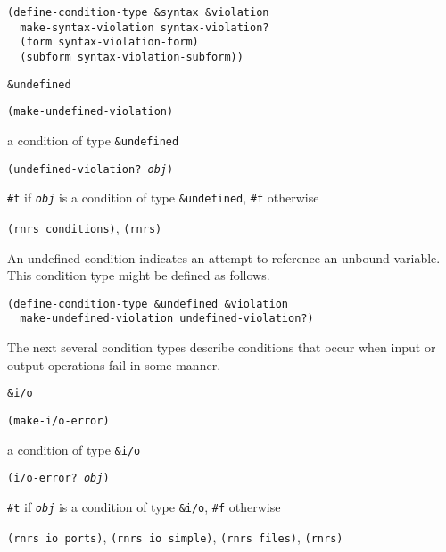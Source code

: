 \begin{alltt}
(define-condition-type \&{}syntax \&{}violation
  make-syntax-violation syntax-violation?
  (form syntax-violation-form)
  (subform syntax-violation-subform))
\end{alltt}

\begin{description}

\label{exceptions_s31}\item[syntax] \texttt{\&{}undefined}



\item[procedure] \texttt{(make-undefined-violation)}



\item[returns] a condition of type \texttt{\&{}undefined}


\item[procedure] \texttt{(undefined-violation? \textit{obj})}



\item[returns] \texttt{\#{}t} if \texttt{\textit{obj}} is a condition of type \texttt{\&{}undefined}, \texttt{\#{}f} otherwise


\item[libraries] \texttt{(rnrs conditions)}, \texttt{(rnrs)}
\end{description}



An undefined condition indicates an attempt to reference an unbound variable.
This condition type might be defined as follows.

\begin{alltt}
(define-condition-type \&{}undefined \&{}violation
  make-undefined-violation undefined-violation?)
\end{alltt}


The next several condition types describe conditions that occur when
input or output operations fail in some manner.

\begin{description}

\label{exceptions_s32}\item[syntax] \texttt{\&{}i/o}



\item[procedure] \texttt{(make-i/o-error)}



\item[returns] a condition of type \texttt{\&{}i/o}


\item[procedure] \texttt{(i/o-error? \textit{obj})}



\item[returns] \texttt{\#{}t} if \texttt{\textit{obj}} is a condition of type \texttt{\&{}i/o}, \texttt{\#{}f} otherwise


\item[libraries] \texttt{(rnrs io ports)}, \texttt{(rnrs io simple)}, \texttt{(rnrs files)}, \texttt{(rnrs)}
\end{description}



